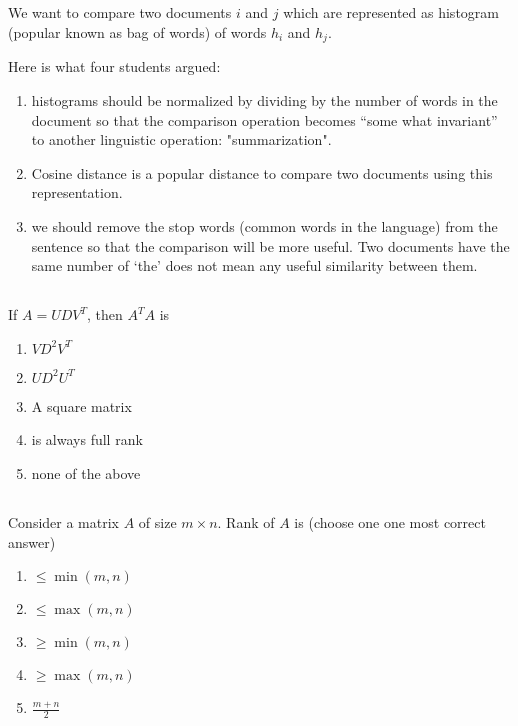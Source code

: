 \begin{frame}
\section{}
We want to compare two documents $i$ and $j$ which are represented as histogram (popular known as bag of words) of words $h_i$ and $h_j$.

Here is what four students argued:

\begin{enumerate}
\item histograms should be normalized by dividing by the number of words in the document so that the comparison operation becomes ``some what invariant'' to another linguistic operation: "summarization".   %
\item Cosine distance is a popular distance to compare two documents using this  representation.    %
\item we should remove the stop words (common words in the language) from the sentence so that the comparison will be more useful. Two documents have the same number of `the' does not mean any useful similarity between them.    %
\end{enumerate}
\end{frame}

\begin{frame}
\section{}
If $A=UDV^T$, then $A^TA$ is
\begin{enumerate}
\item $VD^2V^T$   %
\item $UD^2U^T$
\item A square matrix   %
\item is always full rank
\item none of the above
\end{enumerate}
\end{frame}

\begin{frame}
\section{}
Consider a matrix $A$ of size $m\times n$. Rank of $A$ is (choose one one most correct answer)
\begin{enumerate}
\item $\leq \min(m,n)$    %
\item $\leq \max (m,n)$
\item $\geq \min(m,n)$
\item $\geq \max(m,n)$
\item $\frac{m+n}{2}$
\end{enumerate}
\end{frame}

